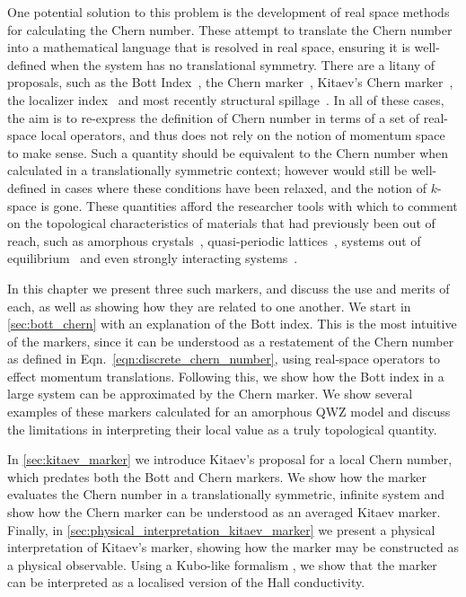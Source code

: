 One potential solution to this problem is the development of real space methods for calculating the Chern number. These attempt to translate the Chern number into a mathematical language that is resolved in real space, ensuring it is well-defined when the system has no translational symmetry. There are a litany of proposals, such as the Bott Index~\cite{toniolo_equivalence_2017,toniolo_time-dependent_2018,hastings_almost_2010, toniolo_bott_2022}, the Chern marker~\cite{bianco_mapping_2011,bianco_orbital_2013}, Kitaev's Chern marker~\cite{kitaev_anyons_2006,mitchell_amorphous_2018, fan_generalized_2023}, the localizer index~\cite{loring_guide_2019} and most recently structural spillage~\cite{munoz-segovia_structural_2023}. In all of these cases, the aim is to re-express the definition of Chern number in terms of a set of real-space local operators, and thus does not rely on the notion of momentum space to make sense. Such a quantity should be equivalent to the Chern number when calculated in a translationally symmetric context; however would still be well-defined in cases where these conditions have been relaxed, and the notion of $k$-space is gone. These quantities afford the researcher tools with which to comment on the topological characteristics of materials that had previously been out of reach, such as amorphous crystals~\cite{agarwala_topological_2017}, quasi-periodic lattices~\cite{huang_theory_2018}, systems out of equilibrium~\cite{caio_topological_2019,toniolo_time-dependent_2018,golovanova_truly_2021,markov_locality_2023} and even strongly interacting systems~\cite{markov_local_2021}.

In this chapter we present three such markers, and discuss the use and merits of each, as well as showing how they are related to one another. We start in \textsection\ref{sec:bott_chern} with an explanation of the Bott index. This is the most intuitive of the markers, since it can be understood as a restatement of the Chern number as defined in Eqn.~\ref{eqn:discrete_chern_number}, using real-space operators to effect momentum translations. Following this, we show how the Bott index in a large system can be approximated by the Chern marker. We show several examples of these markers calculated for an amorphous QWZ model and discuss the limitations in interpreting their local value as a truly topological quantity. 

In \textsection\ref{sec:kitaev_marker} we introduce Kitaev's proposal for a local Chern number, which predates both the Bott and Chern markers. We show how the marker evaluates the Chern number in a translationally symmetric, infinite system and show how the Chern marker can be understood as an averaged Kitaev marker. Finally, in \textsection\ref{sec:physical_interpretation_kitaev_marker} we present a physical interpretation of Kitaev's marker, showing how the marker may be constructed as a physical observable. Using a Kubo-like formalism \cite{kubo_statistical-mechanical_1957}, we show that the marker can be interpreted as a localised version of the Hall conductivity. 